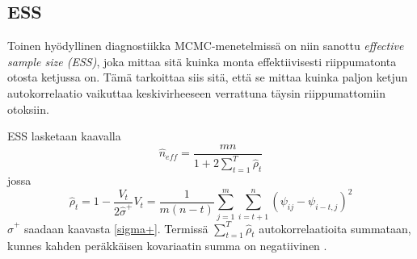 \subsection{ESS}

Toinen hyödyllinen diagnostiikka MCMC-menetelmissä on niin sanottu \textit{effective sample size (ESS)}, joka mittaa sitä kuinka monta effektiivisesti riippumatonta otosta ketjussa on. Tämä tarkoittaa siis sitä, että se mittaa kuinka paljon ketjun autokorrelaatio vaikuttaa keskivirheeseen verrattuna täysin riippumattomiin otoksiin.
\begin{maar}
	ESS lasketaan kaavalla
	\begin{equation}
		\hat{n}_{eff}=\frac{mn}{1+2\sum_{t=1}^{T}\hat{\rho}_t}
	\end{equation}
	jossa 
	\begin{subequations}
	\begin{equation}
		\hat{\rho}_t = 1 - \frac{V_t}{2\hat{\sigma}^+}
	\end{equation}
	\begin{equation}
		V_t=\frac{1}{m(n-t)}\sum_{j=1}^{m}\sum_{i=t+1}^{n}(\psi_{ij}-\psi_{i-t,j})^2
	\end{equation}
	\end{subequations}
	$\hat{\sigma}^+$ saadaan kaavasta \ref{sigma+}. Termissä $\sum_{t=1}^{T}\hat{\rho}_t$ autokorrelaatioita summataan, kunnes kahden peräkkäisen kovariaatin summa on negatiivinen \cite{geyer_practical_1992}.
\end{maar}
















